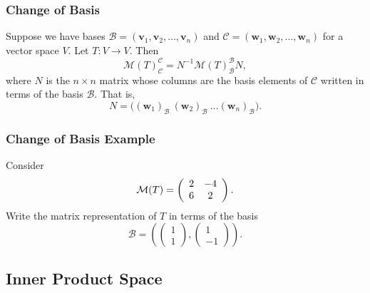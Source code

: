 \documentclass{beamer}
\begin{document}
\begin{frame}
\frametitle{Change of Basis}
Suppose we have bases $\mathcal{B} = ({\boldsymbol  v_1}, {\boldsymbol v_2}, \ldots, {\boldsymbol  v_n})$ and $\mathcal{C} = ({\boldsymbol  w_1}, {\boldsymbol w_2}, \ldots, {\boldsymbol w_n})$ for a vector space $V$. Let $T: V\to V$. Then
$$
\mathcal{M}(T)_{\mathcal{C}}^{\mathcal{C}} = N^{-1} \mathcal{M}(T)_{\mathcal{B}}^{\mathcal{B}} N,
$$
where $N$ is the $n\times n$ matrix whose columns are the basis elements of $\mathcal{C}$ written in terms of the basis $\mathcal{B}$. That is,
$$
N = \Big(({\boldsymbol w_1})_\mathcal{B}\ ({\boldsymbol  w_2})_\mathcal{B}\ \ldots ({\boldsymbol  w_n})_\mathcal{B}\Big).
$$
\end{frame}


\begin{frame}[t]
\frametitle{Change of Basis Example}
\tiny
\begin{Example}
Consider
$$
\mathcal{M}(T) = \left(\begin{array}{c c} 2	&	-4\\ 6		& 2\end{array}\right).
$$
Write the matrix representation of $T$ in terms of the basis
$$
\mathcal{B} = \left(\left(\begin{array}{c} 1\\ 1\end{array}\right), \left(\begin{array}{c} 1\\ -1\end{array}\right)\right).
$$
\end{Example}

\end{frame}

\subsection{Inner Product Space}
\end{document}
